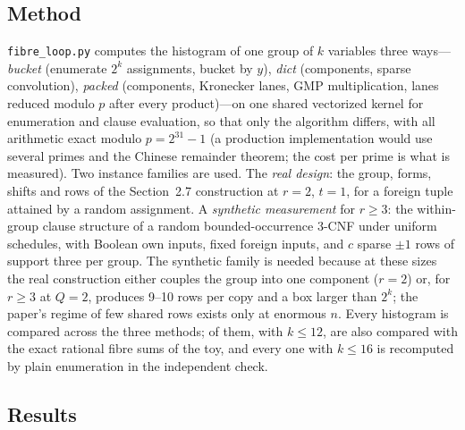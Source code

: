 \documentclass[11pt]{article}
\theoremstyle{definition}
\theoremstyle{remark}
\begin{document}
\subsection{Method}

\texttt{fibre\_loop.py} computes the histogram of one group of $k$ variables three ways---\emph{bucket} (enumerate $2^k$ assignments, bucket by $y$), \emph{dict} (components, sparse convolution), \emph{packed} (components, Kronecker lanes, GMP multiplication, lanes reduced modulo $p$ after every product)---on one shared vectorized kernel for enumeration and clause evaluation, so that only the algorithm differs, with all arithmetic exact modulo $p = 2^{31} - 1$ (a production implementation would use several primes and the Chinese remainder theorem; the cost per prime is what is measured). Two instance families are used. The \emph{real design}: the group, forms, shifts and rows of the Section~2.7 construction at $r = 2$, $t = 1$, for a foreign tuple attained by a random assignment. A \emph{synthetic measurement} for $r \ge 3$: the within-group clause structure of a random bounded-occurrence 3-CNF under uniform schedules, with Boolean own inputs, fixed foreign inputs, and $c$ sparse $\pm1$ rows of support three per group. The synthetic family is needed because at these sizes the real construction either couples the group into one component ($r = 2$) or, for $r \ge 3$ at $Q = 2$, produces 9--10 rows per copy and a box larger than $2^k$; the paper's regime of few shared rows exists only at enormous $n$. Every histogram is compared across the three methods; \fibreExactChecks{} of them, with $k \le 12$, are also compared with the exact rational fibre sums of the toy, and every one with $k \le 16$ is recomputed by plain enumeration in the independent check.

\subsection{Results}
\end{document}
